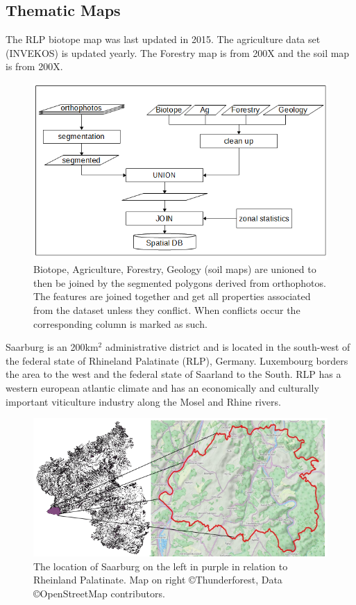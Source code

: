 \documentclass[authoryear, review,12pt,number]{elsarticle}
\begin{document}
\subsection{Thematic Maps} The RLP biotope map was last updated in 2015. The
agriculture data set (INVEKOS) is updated yearly. The Forestry map is from
200X and the soil map is from 200X.

\begin{figure} \includegraphics[width=1\textwidth]{diagrams/pre_processing.png}
    \caption{Biotope, Agriculture, Forestry, Geology (soil maps) are unioned to
    then be joined by the segmented polygons derived from orthophotos. The
    features are joined together and get all properties associated from the
    dataset unless they conflict. When conflicts occur the corresponding column
    is marked as such.}
\label{fig_pre-processing}
\end{figure}
Saarburg is an 200km$^{2}$ administrative district and is located in the
south-west of the federal state of Rhineland Palatinate (RLP), Germany.
Luxembourg borders the area to the west and the federal state of Saarland to
the South.  RLP has a western european atlantic climate and has an economically
and culturally important viticulture industry along the Mosel and Rhine rivers.
\begin{figure}
\label{fig_study_area}
    \includegraphics[width=\textwidth]{diagrams/study_area_closeup.png}
    \caption{The location of Saarburg on the left in purple in relation to
    Rheinland Palatinate. Map on right \copyright Thunderforest, Data
\copyright OpenStreetMap contributors.}
\end{figure}
\end{document}
